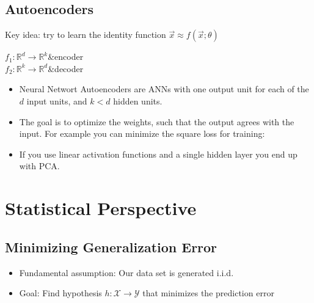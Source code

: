\documentclass[8pt,a4paper]{scrartcl}
\begin{document}
\begin{multicols*}{3}
\begin{itemize}
\end{itemize}

\subsection{Autoencoders}

Key idea: try to learn the identity function $\vec{x}\approx f(\vec{x};\theta)$


\begin{TDefinitionTable*}
$f_1:\mathbb{R}^d\rightarrow\mathbb{R}^k$&encoder\\
$f_2:\mathbb{R}^k\rightarrow\mathbb{R}^d$&decoder\\
\end{TDefinitionTable*}

\begin{itemize}
\ncompaq
\item Neural Networt Autoencoders are ANNs with one output unit for each of the $d$ input units, and $k<d$ hidden units.
\item The goal is to optimize the weights, such that the output agrees with the input. For example you can minimize the square loss for training:

\item If you use linear activation functions and a single hidden layer you end up with PCA.
\end{itemize}

\section{Statistical Perspective}

\subsection{Minimizing Generalization Error}

\begin{itemize}
\ncompaq
\item Fundamental assumption: Our data set is generated i.i.d.
\item Goal: Find hypothesis $h:\mathcal{X}\rightarrow\mathcal{Y}$ that minimizes the prediction error


\end{itemize}
\end{multicols*}
\end{document}
